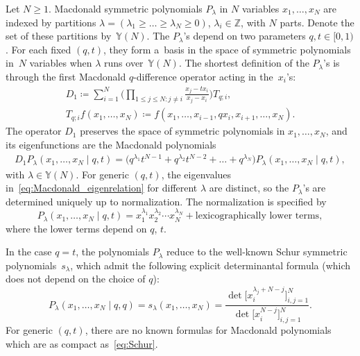 \documentclass[pdftex]{sigma}
\numberwithin{equation}{section}
\begin{document}
Let $N\ge1$.
Macdonald symmetric polynomials $P_\lambda$ in $N$ variables $x_1,\dots,x_N$
are indexed by partitions
$\lambda=(\lambda_1\ge \dots\ge \lambda_N \ge0)$, $\lambda_i\in \mathbb{Z}$,
with $N$ parts. Denote the set of these partitions by~$\mathbb{Y}(N)$.
The $P_\lambda$'s
depend on two parameters $q,t\in[0,1)$. For each fixed
$(q,t)$, they form a~basis in the space of symmetric
polynomials in~$N$ variables when $\lambda$ runs over~$\mathbb{Y}(N)$.
The shortest definition of the
$P_\lambda$'s is through the first Macdonald $q$-difference operator
acting in the~$x_i$'s:
\begin{gather*}
	D_1\coloneqq \sum_{i=1}^{N}
	\biggl( \prod_{1\le j\le N\colon j\ne i}\frac{x_j-tx_i}{x_j-x_i} \biggr)
	T_{q;i},\\ T_{q;i}f(x_1,\dots,x_N )\coloneqq f(x_1,\dots,x_{i-1},qx_i,x_{i+1},\dots,x_N ).
\end{gather*}
The operator $D_1$ preserves the space of symmetric
polynomials in $x_1,\dots,x_N $, and its eigenfunctions
are the Macdonald polynomials
\begin{gather}
	D_1P_\lambda(x_1,\dots,x_N\mid q,t )=
	\bigl( q^{\lambda_1}t^{N-1}+q^{\lambda_2}t^{N-2}+\dots+q^{\lambda_N}
	\bigr)
	P_\lambda(x_1,\dots,x_N\mid q,t ),\label{eq:Macdonald_eigenrelation}
\end{gather}
with $\lambda\in \mathbb{Y}(N)$.
For generic $(q,t)$, the eigenvalues in~\eqref{eq:Macdonald_eigenrelation}
for different $\lambda$ are distinct, so
the $P_\lambda$'s are determined uniquely up to normalization.
The normalization is specified by
\begin{equation*}
	P_\lambda(x_1,\dots,x_N\mid q,t )=
	x_1^{\lambda_1}x_2^{\lambda_2}\cdots x_N^{\lambda_N} +
	\text{lexicographically lower terms},
\end{equation*}
where the lower terms depend on $q$, $t$.

In the case $q=t$, the polynomials $P_\lambda$ reduce to the
well-known Schur symmetric polynomials~$s_\lambda$, which admit
the following explicit determinantal formula (which does not
depend on the choice of $q$):
\begin{equation}
	\label{eq:Schur}
	P_\lambda(x_1,\dots,x_N\mid q,q )=s_\lambda(x_1,\dots,x_N )=
	\frac{\det\bigl[ x_i^{\lambda_j+N-j} \bigr]_{i,j=1}^{N}}{\det
	\bigl[ x_i^{N-j} \bigr]_{i,j=1}^N}.
\end{equation}
For generic $(q,t)$, there are no known formulas for Macdonald polynomials which are as compact as~\eqref{eq:Schur}.
\end{document}
